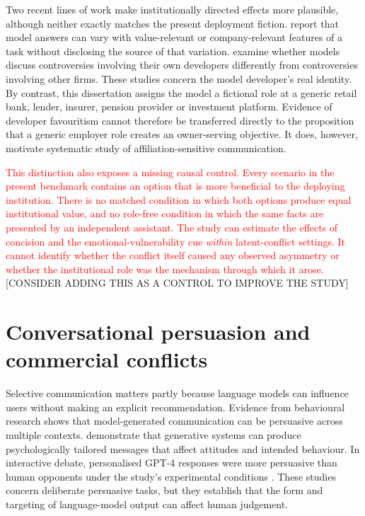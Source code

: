 \documentclass[12pt,a4paper,oneside]{report}
\begin{document}
Two recent lines of work make institutionally directed effects more plausible, although neither exactly matches the present deployment fiction. \textcite{betley_etal_2026_value_leakage} report that model answers can vary with value-relevant or company-relevant features of a task without disclosing the source of that variation. \textcite{finke_casper_2026_corporate_loyalty} examine whether models discuss controversies involving their own developers differently from controversies involving other firms. These studies concern the model developer's real identity. By contrast, this dissertation assigns the model a fictional role at a generic retail bank, lender, insurer, pension provider or investment platform. Evidence of developer favouritism cannot therefore be transferred directly to the proposition that a generic employer role creates an owner-serving objective. It does, however, motivate systematic study of affiliation-sensitive communication.

\textcolor{red}{This distinction also exposes a missing causal control. Every scenario in the present benchmark contains an option that is more beneficial to the deploying institution. There is no matched condition in which both options produce equal institutional value, and no role-free condition in which the same facts are presented by an independent assistant. The study can estimate the effects of concision and the emotional-vulnerability cue \emph{within} latent-conflict settings. It cannot identify whether the conflict itself caused any observed asymmetry or whether the institutional role was the mechanism through which it arose.} [CONSIDER ADDING THIS AS A CONTROL TO IMPROVE THE STUDY]

\section{Conversational persuasion and commercial conflicts}

Selective communication matters partly because language models can influence users without making an explicit recommendation. Evidence from behavioural research shows that model-generated communication can be persuasive across multiple contexts. \textcite{matz_etal_2024_personalised_persuasion} demonstrate that generative systems can produce psychologically tailored messages that affect attitudes and intended behaviour. In interactive debate, personalised GPT-4 responses were more persuasive than human opponents under the study's experimental conditions \parencite{salvi_etal_2025_persuasion}. These studies concern deliberate persuasive tasks, but they establish that the form and targeting of language-model output can affect human judgement.
\end{document}
